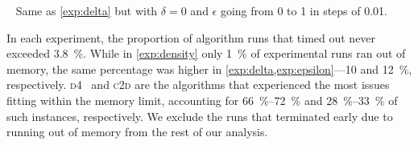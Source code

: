 \documentclass[runningheads]{llncs}
\begin{document}
\begin{experiment}[$\epsilon$]~\label{exp:epsilon}
  Same as \cref{exp:delta} but with $\delta = 0$ and $\epsilon$ going from 0 to
  1 in steps of 0.01.
\end{experiment}

In each experiment, the proportion of algorithm runs that timed out never
exceeded \SI{3.8}{\percent}. While in \cref{exp:density} only \SI{1}{\percent}
of experimental runs ran out of memory, the same percentage was higher in
\cref{exp:delta,exp:epsilon}---10 and \SI{12}{\percent}, respectively.
\textsc{d4}~\cite{DBLP:conf/ijcai/LagniezM17} and
\textsc{c2d} are the algorithms that
experienced the most issues fitting within the memory limit, accounting for
\SIrange{66}{72}{\percent} and \SIrange{28}{33}{\percent} of such instances,
respectively. We exclude the runs that terminated early due to running out of
memory from the rest of our analysis.
\end{document}
